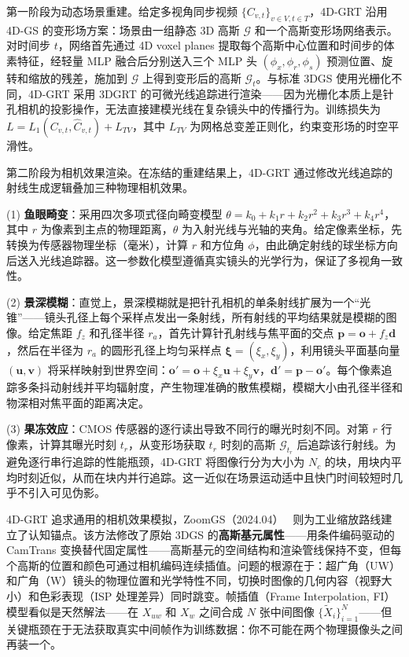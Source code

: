 第一阶段为动态场景重建。给定多视角同步视频 $\{C_{v,t}\}_{v\in V, t\in T}$，4D-GRT 沿用 4D-GS 的变形场方案：场景由一组静态 3D 高斯 $\mathcal{G}$ 和一个高斯变形场网络表示。对时间步 $t$，网络首先通过 4D voxel planes 提取每个高斯中心位置和时间步的体素特征，经轻量 MLP 融合后分别送入三个 MLP 头 $(\phi_x, \phi_r, \phi_s)$ 预测位置、旋转和缩放的残差，施加到 $\mathcal{G}$ 上得到变形后的高斯 $\mathcal{G}_t$。与标准 3DGS 使用光栅化不同，4D-GRT 采用 3DGRT 的可微光线追踪进行渲染——因为光栅化本质上是针孔相机的投影操作，无法直接建模光线在复杂镜头中的传播行为。训练损失为 $L = L_1(C_{v,t}, \hat{C}_{v,t}) + L_{TV}$，其中 $L_{TV}$ 为网格总变差正则化，约束变形场的时空平滑性。

第二阶段为相机效果渲染。在冻结的重建结果上，4D-GRT 通过修改光线追踪的射线生成逻辑叠加三种物理相机效果。

(1) \textbf{鱼眼畸变}：采用四次多项式径向畸变模型 $\theta = k_0 + k_1 r + k_2 r^2 + k_3 r^3 + k_4 r^4$，其中 $r$ 为像素到主点的物理距离，$\theta$ 为入射光线与光轴的夹角。给定像素坐标，先转换为传感器物理坐标（毫米），计算 $r$ 和方位角 $\phi$，由此确定射线的球坐标方向后送入光线追踪器。这一参数化模型遵循真实镜头的光学行为，保证了多视角一致性。

(2) \textbf{景深模糊}：直觉上，景深模糊就是把针孔相机的单条射线扩展为一个“光锥”——镜头孔径上每个采样点发出一条射线，所有射线的平均结果就是模糊的图像。给定焦距 $f_z$ 和孔径半径 $r_a$，首先计算针孔射线与焦平面的交点 $\mathbf{p} = \mathbf{o} + f_z \mathbf{d}$，然后在半径为 $r_a$ 的圆形孔径上均匀采样点 $\boldsymbol{\xi} = (\xi_x, \xi_y)$，利用镜头平面基向量 $(\mathbf{u}, \mathbf{v})$ 将采样映射到世界空间：$\mathbf{o}' = \mathbf{o} + \xi_x \mathbf{u} + \xi_y \mathbf{v}$，$\mathbf{d}' = \mathbf{p} - \mathbf{o}'$。每个像素追踪多条抖动射线并平均辐射度，产生物理准确的散焦模糊，模糊大小由孔径半径和物深相对焦平面的距离决定。

(3) \textbf{果冻效应}：CMOS 传感器的逐行读出导致不同行的曝光时刻不同。对第 $r$ 行像素，计算其曝光时刻 $t_r$，从变形场获取 $t_r$ 时刻的高斯 $\mathcal{G}_{t_r}$ 后追踪该行射线。为避免逐行串行追踪的性能瓶颈，4D-GRT 将图像行分为大小为 $N_c$ 的块，用块内平均时刻近似，从而在块内并行追踪。这一近似在场景运动适中且快门时间较短时几乎不引入可见伪影。

4D-GRT 追求通用的相机效果模拟，ZoomGS（2024.04）~\cite{2404_04908} 则为工业缩放路线建立了认知锚点。该方法修改了原始 3DGS 的\textbf{高斯基元属性}——用条件编码驱动的 CamTrans 变换替代固定属性——高斯基元的空间结构和渲染管线保持不变，但每个高斯的位置和颜色可通过相机编码连续插值。问题的根源在于：超广角（UW）和广角（W）镜头的物理位置和光学特性不同，切换时图像的几何内容（视野大小）和色彩表现（ISP 处理差异）同时跳变。帧插值（Frame Interpolation, FI）模型看似是天然解法——在 $X_{uw}$ 和 $X_w$ 之间合成 $N$ 张中间图像 $\{\tilde{X}_i\}_{i=1}^N$——但关键瓶颈在于无法获取真实中间帧作为训练数据：你不可能在两个物理摄像头之间再装一个。

